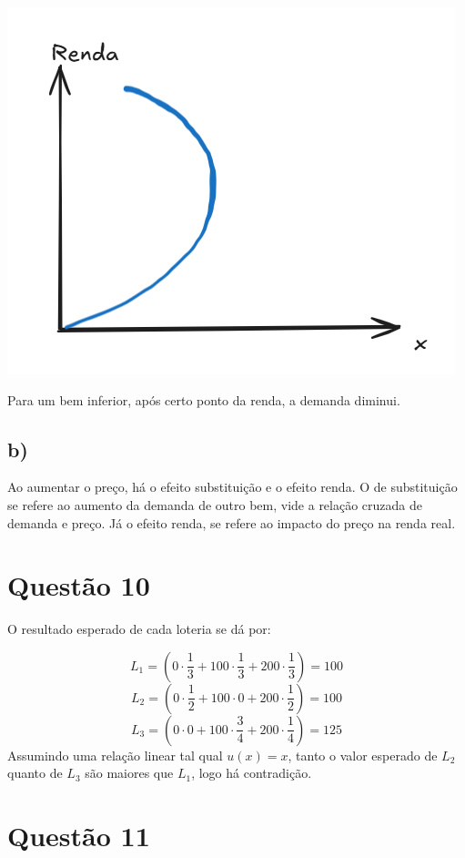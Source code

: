 \documentclass[
  letterpaper,
  DIV=11,
  numbers=noendperiod]{scrartcl}
\begin{document}
\begin{center}
\includegraphics{engelinferior.png}
\end{center}
Para um bem inferior, após certo ponto da renda, a demanda diminui.

\subsection{b)}\label{b-5}

Ao aumentar o preço, há o efeito substituição e o efeito renda. O de
substituição se refere ao aumento da demanda de outro bem, vide a
relação cruzada de demanda e preço. Já o efeito renda, se refere ao
impacto do preço na renda real.

\section{Questão 10}\label{questuxe3o-10}

O resultado esperado de cada loteria se dá por:

\[
L_1 = \left(0\cdot \frac{1}{3} + 100 \cdot \frac{1}{3} + 200 \cdot \frac{1}{3}\right) = 100
\] \[
L_2 = \left(0\cdot \frac{1}{2} + 100 \cdot 0 + 200 \cdot \frac{1}{2}\right) = 100
\] \[
L_3 = \left(0\cdot 0 + 100 \cdot \frac{3}{4} + 200 \cdot \frac{1}{4}\right) = 125
\] Assumindo uma relação linear tal qual \(u(x) = x\), tanto o valor
esperado de \(L_2\) quanto de \(L_3\) são maiores que \(L_1\), logo há
contradição.

\section{Questão 11}\label{questuxe3o-11}
\end{document}
